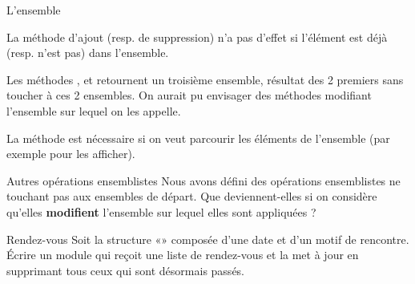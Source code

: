 \begin{Exercice}{L'ensemble}

	\begin{liste}
		\item 
			La méthode d'ajout (resp. de suppression) n'a
			pas d'effet si l'élément est déjà
			(resp. n'est pas) dans l'ensemble.
		\item 
			Les méthodes , 
			 et 
			 retournent un troisième ensemble, 
			résultat des 2 premiers sans toucher
			à ces 2 ensembles. On aurait pu envisager des méthodes modifiant
			l'ensemble sur lequel on les appelle.
		\item 
			La méthode 
			est nécessaire si on veut parcourir les éléments de
			l'ensemble (par exemple pour les afficher).
	\end{liste}
\end{Exercice}

\begin{Exercice}{Autres opérations ensemblistes}
	Nous avons défini des opérations ensemblistes ne touchant pas aux
	ensembles de départ. Que deviennent-elles si on considère
	qu'elles \textbf{modifient}
	l'ensemble sur lequel elles sont appliquées ?
\end{Exercice}


\begin{Exercice}{Rendez-vous}
	Soit la structure «» composée d’une date
	et d’un motif de rencontre. Écrire un module qui reçoit une liste de
	rendez-vous et la met à jour en supprimant tous ceux qui sont désormais
	passés. 

\end{Exercice}

